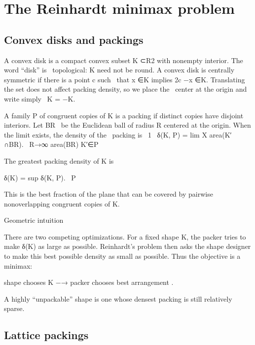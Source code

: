 \chapter{The Reinhardt minimax problem}
\section{Convex disks and packings}

\begin{displaytext}
A convex disk is a compact convex subset K ⊂R2 with nonempty interior. The word “disk” is \
topological: K need not be round. A convex disk is centrally symmetric if there is a point c such \
that x ∈K implies 2c −x ∈K. Translating the set does not affect packing density, so we place the \
center at the origin and write simply \
K = −K.
\end{displaytext}

\begin{displaytext}
A family P of congruent copies of K is a packing if distinct copies have disjoint interiors. Let BR \
be the Euclidean ball of radius R centered at the origin. When the limit exists, the density of the \
packing is \
1 \
δ(K, P) = lim X area(K′ ∩BR). \
R→∞ area(BR) K′∈P
\end{displaytext}

The greatest packing density of K is


\begin{displaytext}
δ(K) = sup δ(K, P). \
P
\end{displaytext}

This is the best fraction of the plane that can be covered by pairwise nonoverlapping congruent copies of K.


\begin{insightbox}{Geometric intuition}
\end{insightbox}

There are two competing optimizations. For a fixed shape K, the packer tries to make δ(K) as large as possible. Reinhardt’s problem then asks the shape designer to make this best possible density as small as possible. Thus the objective is a minimax:


shape chooses K −→ packer chooses best arrangement .


A highly “unpackable” shape is one whose densest packing is still relatively sparse.


\section{Lattice packings}

